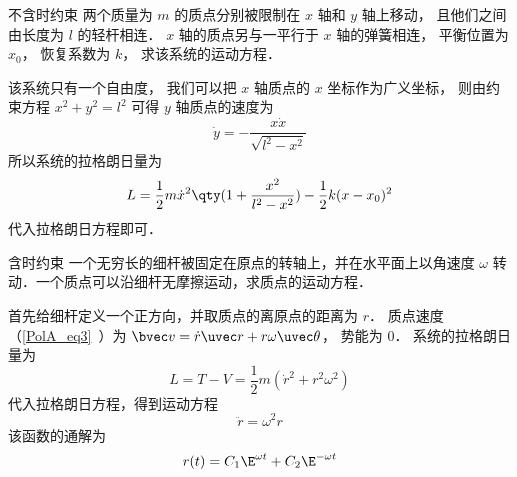 \begin{example}{不含时约束}
两个质量为 $m$ 的质点分别被限制在 $x$ 轴和 $y$ 轴上移动， 且他们之间由长度为 $l$ 的轻杆相连． $x$ 轴的质点另与一平行于 $x$ 轴的弹簧相连， 平衡位置为 $x_0$， 恢复系数为 $k$， 求该系统的运动方程．%

该系统只有一个自由度， 我们可以把 $x$ 轴质点的 $x$ 坐标作为广义坐标， 则由约束方程 $x^2 + y^2 = l^2$ 可得 $y$ 轴质点的速度为
\begin{equation}
\dot y = -\frac{x\dot x}{\sqrt{l^2 - x^2}}
\end{equation}
所以系统的拉格朗日量为
\begin{equation}
L = \frac12 m \dot x^2\qty(1 + \frac{x^2}{l^2 - x^2}) - \frac12 k (x-x_0)^2
\end{equation}
代入拉格朗日方程即可．
\end{example}

\begin{example}{含时约束}
一个无穷长的细杆被固定在原点的转轴上，并在水平面上以角速度 $\omega$ 转动．一个质点可以沿细杆无摩擦运动，求质点的运动方程．

首先给细杆定义一个正方向，并取质点的离原点的距离为 $r$． 质点速度（\autoref{PolA_eq3}~）为 $\bvec v = \dot r \uvec r + r\omega \uvec\theta$， 势能为 0． 系统的拉格朗日量为
\begin{equation}
L = T - V = \frac12 m(\dot r^2 + r^2 \omega^2)
\end{equation}
代入拉格朗日方程，得到运动方程
\begin{equation}
\ddot r = \omega^2 r
\end{equation}
该函数的通解为%
\begin{equation}
r(t) = C_1 \E^{\omega t} + C_2 \E^{-\omega t}
\end{equation}
\end{example}

